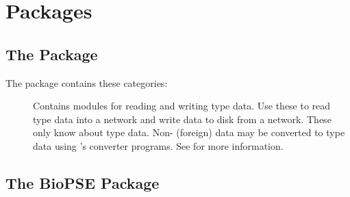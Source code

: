 %

\section{Packages}
\label{sec:packages}

\missing{}

\subsection{The \sr{} Package}
\label{sec:srpackage}

The \sr{} package contains these categories:

\begin{description}
\item[] Contains modules for reading and writing \sr{}
  type data.  Use these to read \sr{} type data into a network and write
  data to disk from a network.  These only know about \sr{} type data.
  Non-\sr{} (foreign) data may be converted to \sr{} type data using
  \sr{}'s converter programs.  See  for more
  information.
\item[] \missing{}
\item[] \missing{}
\item[] \missing{}
\item[] 
\end{description}

\subsection{The BioPSE Package}
\label{sec:biopsepackage}

\begin{description}
\item[] \missing{}
\item[] \missing{}
\item[] \missing{}
\item[] \missing{}
\end{description}

